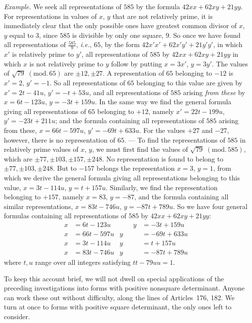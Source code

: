 \textit{Example.} We seek all representations of $585$ by the formula
$42xx+62xy+21yy$. For representations in values of $x$, $y$ that are not relatively prime, it is immediately clear that the only possible ones have greatest common divisor of $x$, $y$ equal to $3$, since $585$ is divisible by only one square, $9$. So once we have found all representations of $\frac{585}{9}$, \textit{i.e.}, $65$, by the form $42x'x'+62x'y'+21y'y'$, in which $x'$ is relatively prime to $y'$, all representations of $585$ by $42xx+62xy+21yy$ in which $x$ is not relatively prime to $y$ follow by putting $x=3x'$, $y=3y'$. The values of $\sqrt{79}\;(\mathrm{mod.}\,65)$ are $\pm12,\pm27$. A representation of $65$ belonging to $-12$ is $x'=2$, $y'=-1$. So all representations of $65$ belonging to this value are given by $x'=2t-41u$, $y'=-t+53u$, and all representations of $585$ arising \textit{from these} by $x=6t-123u$, $y=-3t+159u$. In the same way we find the general formula giving all representations of $65$ belonging to $+12$, namely $x'=22t-199u$, $y'=-23t+211u$; and the formula containing all representations of $585$ arising from these, $x=66t-597u$, $y'=-69t+633u$. For the values $+27$ and $-27$, however, there is no representation of $65$. --- To find the representations of $585$ in relatively prime values of $x$, $y$, we must first find the values of $\sqrt{79}\;(\mathrm{mod.}\,585)$, which are $\pm77,\pm103,\pm157,\pm248$. No representation is found to belong to $\pm77,\pm103,\pm248$. But to $-157$ belongs the representation $x=3$, $y=1$, from which we derive the general formula giving all representations belonging to this value, $x=3t-114u$, $y=t+157u$. Similarly, we find the representation belonging to $+157$, namely $x=83$, $y=-87$, and the formula containing all similar representations, $x=83t-746u$, $y=-87t+789u$. So we have four general formulas containing all representations of $585$ by $42xx+62xy+21yy$:
\[
\begin{aligned}
x&=6t-123u&\qquad y&=-3t+159u\\
x&=66t-597u& y&=-69t+633u\\
x&=3t-114u& y&=t+157u\\
x&=83t-746u& y&=-87t+789u
\end{aligned}
\]
where $t,u$ range over all integers satisfying $tt-79uu=1$.

To keep this account brief, we will not dwell on special applications of the preceding investigations into forms with positive nonsquare determinant. Anyone can work these out without difficulty, along the lines of Articles~176, 182. We turn at once to forms with positive square determinant, the only ones left to consider.

